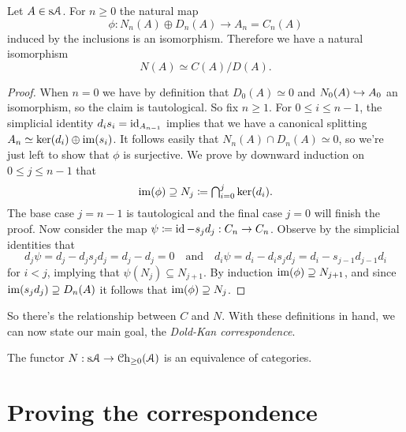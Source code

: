 \begin{proposition}
  \label{splitting}
  Let $A \in \mathrm{s}\mathcal{A}$. For $n \ge 0$ the natural map
  \[
  \phi : N_n(A) \oplus D_n(A) \to A_n = C_n(A)
  \]
  induced by the inclusions is an isomorphism. Therefore we have a
  natural isomorphism
  \[
  N(A) \simeq C(A)/D(A).
  \]
\end{proposition}

\begin{proof}
  When $n=0$ we have by definition that $D_0(A) \simeq 0$ and $N_0(A)
  \hookrightarrow A_0$ an isomorphism, so the claim is tautological. So fix $n
  \ge 1$. For $0 \le i \le n - 1$, the simplicial identity $d_is_i =
  \operatorname{id}_{A_{n-1}}$ implies that we have a canonical splitting $A_n
  \simeq \ker(d_i) \oplus \operatorname{im}(s_i)$. It follows easily that $N_n(A)
  \cap D_n(A) \simeq 0$, so we're just left to show that $\phi$ is
  surjective. We prove by downward induction on $0 \le j \le n-1$ that
  \[
  \textstyle{\operatorname{im}(\phi) \supseteq N_j \coloneqq\bigcap_{i=0}^j
    \ker(d_i).}
  \]
  The base case $j = n-1$ is tautological and the final case $j = 0$
  will finish the proof. Now consider the map $\psi \coloneqq \operatorname{id} -
  s_jd_j : C_n \to C_n$. Observe by the simplicial identities that
  \[
  d_j\psi = d_j - d_js_jd_j = d_j - d_j = 0 \quad\text{and}\quad
  d_i\psi = d_i - d_is_jd_j = d_i - s_{j-1}d_{j-1}d_i
  \]
  for $i < j$, implying that $\psi(N_j) \subseteq N_{j+1}$. By
  induction $\operatorname{im}(\phi) \supseteq N_{j+1}$, and since $\operatorname{im}(s_jd_j)
  \supseteq D_n(A)$ it follows that $\operatorname{im}(\phi) \supseteq N_j$.
\end{proof}

So there's the relationship between $C$ and $N$. With these
definitions in hand, we can now state our main goal, the
\textit{Dold-Kan correspondence}.

\begin{theorem}
  \label{doldkan}
  The functor $N : \mathrm{s}\mathcal{A} \to {\mathcal{C}\mathrm{h}}_{\ge 0}(\mathcal{A})$ is an equivalence of
  categories.
\end{theorem}


\section{Proving the correspondence}

